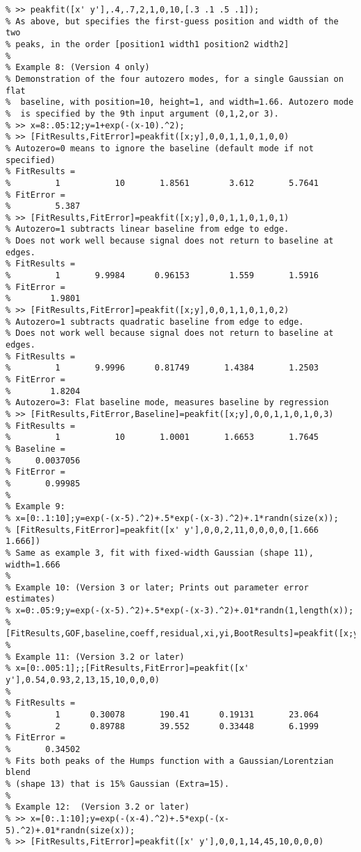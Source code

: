 \begin{lstlisting}
% >> peakfit([x' y'],.4,.7,2,1,0,10,[.3 .1 .5 .1]);
% As above, but specifies the first-guess position and width of the two
% peaks, in the order [position1 width1 position2 width2]
%
% Example 8: (Version 4 only)
% Demonstration of the four autozero modes, for a single Gaussian on flat
%  baseline, with position=10, height=1, and width=1.66. Autozero mode
%  is specified by the 9th input argument (0,1,2,or 3).
% >> x=8:.05:12;y=1+exp(-(x-10).^2);
% >> [FitResults,FitError]=peakfit([x;y],0,0,1,1,0,1,0,0)
% Autozero=0 means to ignore the baseline (default mode if not specified)
% FitResults =
%         1           10       1.8561        3.612       5.7641
% FitError =
%         5.387
% >> [FitResults,FitError]=peakfit([x;y],0,0,1,1,0,1,0,1)
% Autozero=1 subtracts linear baseline from edge to edge.
% Does not work well because signal does not return to baseline at edges.
% FitResults =
%         1       9.9984      0.96153        1.559       1.5916
% FitError =
%        1.9801
% >> [FitResults,FitError]=peakfit([x;y],0,0,1,1,0,1,0,2)
% Autozero=1 subtracts quadratic baseline from edge to edge.
% Does not work well because signal does not return to baseline at edges.
% FitResults =
%         1       9.9996      0.81749       1.4384       1.2503
% FitError =
%        1.8204
% Autozero=3: Flat baseline mode, measures baseline by regression
% >> [FitResults,FitError,Baseline]=peakfit([x;y],0,0,1,1,0,1,0,3)
% FitResults =
%         1           10       1.0001       1.6653       1.7645
% Baseline =
%     0.0037056
% FitError =
%       0.99985
%
% Example 9:
% x=[0:.1:10];y=exp(-(x-5).^2)+.5*exp(-(x-3).^2)+.1*randn(size(x));
% [FitResults,FitError]=peakfit([x' y'],0,0,2,11,0,0,0,0,[1.666 1.666])
% Same as example 3, fit with fixed-width Gaussian (shape 11), width=1.666
% 
% Example 10: (Version 3 or later; Prints out parameter error estimates)
% x=0:.05:9;y=exp(-(x-5).^2)+.5*exp(-(x-3).^2)+.01*randn(1,length(x));
% [FitResults,GOF,baseline,coeff,residual,xi,yi,BootResults]=peakfit([x;y],0,0,2,6,0,1,0,0,0);
%
% Example 11: (Version 3.2 or later)
% x=[0:.005:1];;[FitResults,FitError]=peakfit([x' y'],0.54,0.93,2,13,15,10,0,0,0) 
%
% FitResults =
%         1      0.30078       190.41      0.19131       23.064
%         2      0.89788       39.552      0.33448       6.1999
% FitError = 
%       0.34502
% Fits both peaks of the Humps function with a Gaussian/Lorentzian blend
% (shape 13) that is 15% Gaussian (Extra=15).
% 
% Example 12:  (Version 3.2 or later)
% >> x=[0:.1:10];y=exp(-(x-4).^2)+.5*exp(-(x-5).^2)+.01*randn(size(x));
% >> [FitResults,FitError]=peakfit([x' y'],0,0,1,14,45,10,0,0,0) 

\end{lstlisting}
